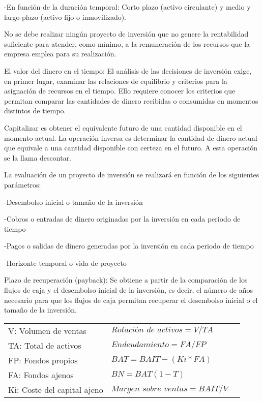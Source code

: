 \documentclass[12pt, twoside, openright]{report} %
\begin{document}
-En función de la duración temporal: Corto plazo (activo circulante) y medio y largo plazo (activo fijo o inmovilizado).

No se debe realizar ningún proyecto de inversión que no genere la rentabilidad suficiente para atender, como mínimo, a la remuneración de los recursos que la empresa emplea para su realización.

El valor del dinero en el tiempo: El análisis de las decisiones de inversión exige, en primer lugar, examinar las relaciones de equilibrio y criterios para la asignación de recursos en el tiempo. Ello requiere conocer los criterios que permitan comparar las cantidades de dinero recibidas o consumidas en momentos distintos de tiempo.

Capitalizar es obtener el equivalente futuro de una cantidad disponible en el momento actual. La operación inversa es determinar la cantidad de dinero actual que equivale a una cantidad disponible con certeza en el futuro. A esta operación se la llama descontar.

La evaluación de un proyecto de inversión se realizará en función de los siguientes parámetros:

-Desembolso inicial o tamaño de la inversión

-Cobros o entradas de dinero originadas por la inversión en cada periodo de tiempo

-Pagos o salidas de dinero generadas por la inversión en cada periodo de tiempo

-Horizonte temporal o vida de proyecto
\pagebreak

Plazo de recuperación (payback): Se obtiene a partir de la comparación de los flujos de caja y el desembolso inicial de la inversión, es decir, el número de años necesario para que los flujos de caja permitan recuperar el desembolso inicial o el tamaño de la inversión.
\begin{table}[H]
	\begin{tabular}{lll}
		V: Volumen de ventas        & $\textit{Rotación de activos} = V / TA$   \\
		TA: Total de activos        & $\textit{Endeudamiento} = FA / FP$        \\
		FP: Fondos propios          & $BAT = BAIT - (Ki * FA)$                  \\
		FA: Fondos ajenos           & $BN = BAT (1 - T)$                        \\
		Ki: Coste del capital ajeno & $\textit{Margen sobre ventas} = BAIT / V$ \\
	\end{tabular}
\end{table}
\end{document}
